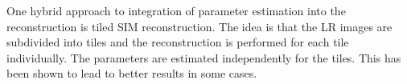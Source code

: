 One hybrid approach to integration of parameter estimation into the reconstruction is tiled \ac{SIM}
    reconstruction.
The idea is that the \ac{LR} images are subdivided into tiles and the reconstruction is performed for each tile
    individually.
The parameters are estimated independently for the tiles.
This has been shown to lead to better results in some cases.

    
